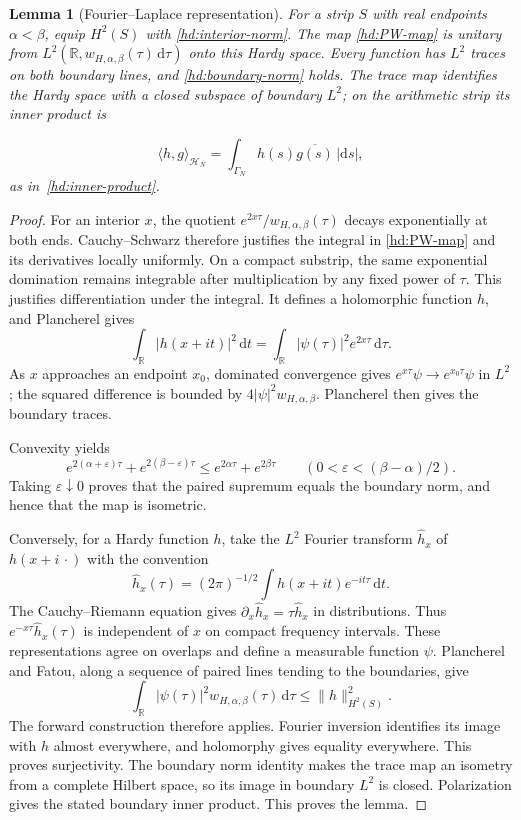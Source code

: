 \documentclass[12pt,a4paper]{amsart}
\numberwithin{equation}{section}
\def\le{\leqslant}
\theoremstyle{plain}
\newtheorem{lemma}[proposition]{Lemma}
\theoremstyle{definition}
\theoremstyle{remark}
\begin{document}
\begin{lemma}[Fourier--Laplace representation]\label{proof:hd:PW}\label{proof:bm:PW}
For a strip $S$ with real endpoints $\alpha<\beta$, equip $H^2(S)$
with \eqref{hd:interior-norm}.
The map \eqref{hd:PW-map} is unitary from
$L^2(\mathbb R,w_{H,\alpha,\beta}(\tau)\,\mathrm{d}\tau)$ onto this Hardy space.
Every function has $L^2$ traces on both boundary lines, and
\eqref{hd:boundary-norm} holds. The trace map identifies the Hardy
space with a closed subspace of boundary $L^2$; on the arithmetic
strip its inner product is
\begin{samepage}
\[
 \langle h,g\rangle_{\mathcal H_N}
       =\int_{\Gamma_N}h(s)\overline{g(s)}\,|\mathrm{d}s|,
\]
as in~\eqref{hd:inner-product}.
\end{samepage}
\end{lemma}

\begin{proof}
For an interior $x$, the quotient
$e^{2x\tau}/w_{H,\alpha,\beta}(\tau)$ decays exponentially at
both ends. Cauchy--Schwarz therefore justifies the integral in
\eqref{hd:PW-map} and its derivatives locally uniformly.
On a compact substrip, the same exponential domination remains
integrable after multiplication by any fixed power of $\tau$.
This justifies differentiation under the integral. It defines a holomorphic function $h$, and Plancherel gives
\[
 \int_{\mathbb R}|h(x+it)|^2\,\mathrm{d}t
   =\int_{\mathbb R}|\psi(\tau)|^2e^{2x\tau}\,\mathrm{d}\tau.
\]
As $x$ approaches an endpoint $x_0$, dominated convergence gives
$e^{x\tau}\psi\to e^{x_0\tau}\psi$ in $L^2$; the squared
difference is bounded by $4|\psi|^2w_{H,\alpha,\beta}$.
Plancherel then gives the boundary traces.

Convexity yields
\[
 e^{2(\alpha+\varepsilon)\tau}+e^{2(\beta-\varepsilon)\tau}
 \le e^{2\alpha\tau}+e^{2\beta\tau}
 \qquad(0<\varepsilon<(\beta-\alpha)/2).
\]
Taking $\varepsilon\downarrow0$ proves that the paired supremum
equals the boundary norm, and hence that the map is isometric.

Conversely, for a Hardy function $h$, take the $L^2$ Fourier
transform $\widehat h_x$ of $h(x+i\,\cdot)$ with the convention
\[
 \widehat h_x(\tau)=(2\pi)^{-1/2}
       \int h(x+it)e^{-it\tau}\,\mathrm{d}t.
\]
The Cauchy--Riemann equation gives
$\partial_x\widehat h_x=\tau\widehat h_x$ in distributions.
Thus $e^{-x\tau}\widehat h_x(\tau)$ is independent of $x$
on compact frequency intervals. These representations agree on
overlaps and define a measurable function $\psi$.
Plancherel and Fatou, along a sequence of paired lines tending
to the boundaries, give
\[
 \int_{\mathbb R}|\psi(\tau)|^2w_{H,\alpha,\beta}(\tau)\,\mathrm{d}\tau
 \le\|h\|_{H^2(S)}^2.
\]
The forward construction therefore applies. Fourier inversion
identifies its image with $h$ almost everywhere, and holomorphy
gives equality everywhere. This proves surjectivity. The boundary
norm identity makes the trace map an isometry from a complete Hilbert
space, so its image in boundary $L^2$ is closed. Polarization gives
the stated boundary inner product.
This proves the lemma.
\end{proof}
\end{document}
